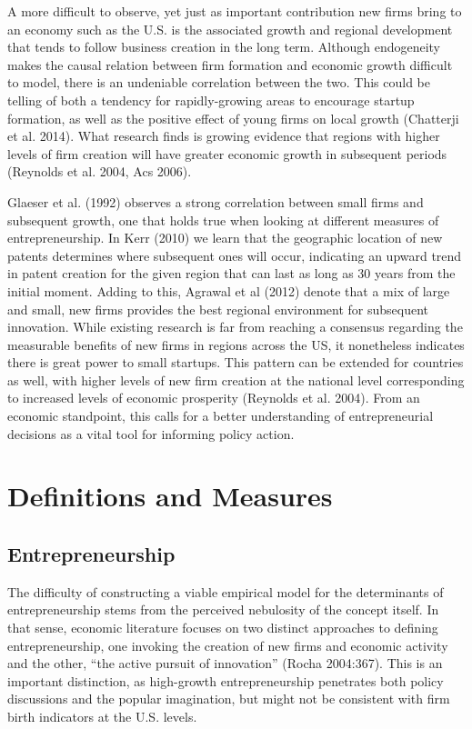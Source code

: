 A more difficult to observe, yet just as important contribution new firms bring to an economy such as the U.S. is the associated growth and regional development that tends to follow business creation in the long term. Although endogeneity makes the causal relation between firm formation and economic growth difficult to model, there is an undeniable correlation between the two. This could be telling of both a tendency for rapidly-growing areas to encourage startup formation, as well as the positive effect of young firms on local growth (Chatterji et al. 2014). What research finds is growing evidence that regions with higher levels of firm creation will have greater economic growth in subsequent periods (Reynolds et al. 2004, Acs 2006). 

Glaeser et al. (1992) observes a strong correlation between small firms and subsequent growth, one that holds true when looking at different measures of entrepreneurship. In Kerr (2010) we learn that the geographic location of new patents determines where subsequent ones will occur, indicating an upward trend in patent creation for the given region that can last as long as 30 years from the initial moment. Adding to this, Agrawal et al (2012) denote that a mix of large and small, new firms provides the best regional environment for subsequent innovation.  While existing research is far from reaching a consensus regarding the measurable benefits of new firms in regions across the US, it nonetheless indicates there is great power to small startups. This pattern can be extended for countries as well, with higher levels of new firm creation at the national level corresponding to increased levels of economic prosperity (Reynolds et al. 2004). From an economic standpoint, this calls for a better understanding of entrepreneurial decisions as a vital tool for informing policy action. 

\section{Definitions and Measures}

\subsection{Entrepreneurship}

The difficulty of constructing a viable empirical model for the determinants of entrepreneurship stems from the perceived nebulosity of the concept itself. In that sense, economic literature focuses on two distinct approaches to defining entrepreneurship, one invoking the creation of new firms and economic activity and the other, “the active pursuit of innovation” (Rocha 2004:367). This is an important distinction, as high-growth entrepreneurship penetrates both policy discussions and the popular imagination, but might not be consistent with firm birth indicators at the U.S. levels. 

